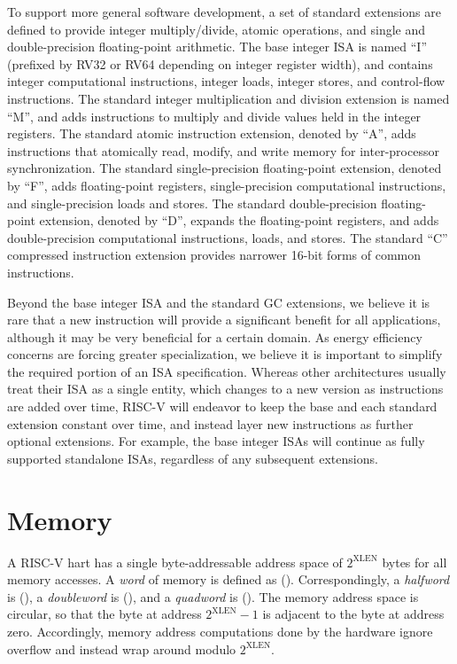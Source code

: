 To support more general software development, a set of standard
extensions are defined to provide integer multiply/divide, atomic
operations, and single and double-precision floating-point arithmetic.
The base integer ISA is named ``I'' (prefixed by RV32 or RV64
depending on integer register width), and contains integer
computational instructions, integer loads, integer stores, and
control-flow instructions.  The standard integer multiplication and
division extension is named ``M'', and adds instructions to multiply
and divide values held in the integer registers.  The standard atomic
instruction extension, denoted by ``A'', adds instructions that
atomically read, modify, and write memory for inter-processor
synchronization.  The standard single-precision floating-point
extension, denoted by ``F'', adds floating-point registers,
single-precision computational instructions, and single-precision
loads and stores.  The standard double-precision floating-point
extension, denoted by ``D'', expands the floating-point registers, and
adds double-precision computational instructions, loads, and stores.
The standard ``C'' compressed instruction extension
provides narrower 16-bit forms of common instructions.

Beyond the base integer ISA and the standard GC extensions, we believe
it is rare that a new instruction will provide a significant benefit
for all applications, although it may be very beneficial for a certain
domain.  As energy efficiency concerns are forcing greater
specialization, we believe it is important to simplify the required
portion of an ISA specification.  Whereas other architectures usually
treat their ISA as a single entity, which changes to a new version as
instructions are added over time, RISC-V will endeavor to keep the
base and each standard extension constant over time, and instead layer
new instructions as further optional extensions.  For example, the
base integer ISAs will continue as fully supported standalone ISAs,
regardless of any subsequent extensions.

\section{Memory}

A RISC-V hart has a single byte-addressable address space
of $2^{\text{XLEN}}$ bytes for all memory
accesses.  A {\em word} of memory is defined as 
().  Correspondingly, a {\em halfword} is 
(), a {\em doubleword} is 
(), and a {\em quadword} is 
().
The memory address space is circular, so that the byte at address
$2^{\text{XLEN}}-1$ is adjacent to the byte at address zero.  Accordingly, memory
address computations done by the hardware ignore overflow and instead
wrap around modulo $2^{\text{XLEN}}$.



